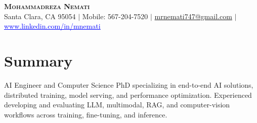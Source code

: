 \documentclass[letterpaper,13pt]{article}
\begin{document}
\begin{center}
    \textbf{\LARGE \scshape Mohammadreza Nemati} \\ \vspace{1pt}
    \small Santa Clara, CA 95054 $|$ Mobile: 567-204-7520 $|$
    \href{mailto:mrnemati747@gmail.com}{mrnemati747@gmail.com} $|$
    \href{https://www.linkedin.com/in/mnemati/}{\textcolor{blue}{\underline{www.linkedin.com/in/mnemati}}}
\end{center}

\section{Summary}
\small{AI Engineer and Computer Science PhD specializing in end-to-end AI solutions, distributed training, model serving, and performance optimization. Experienced developing and evaluating LLM, multimodal, RAG, and computer-vision workflows across training, fine-tuning, and inference.}
\vspace{0.05cm}
\end{document}
